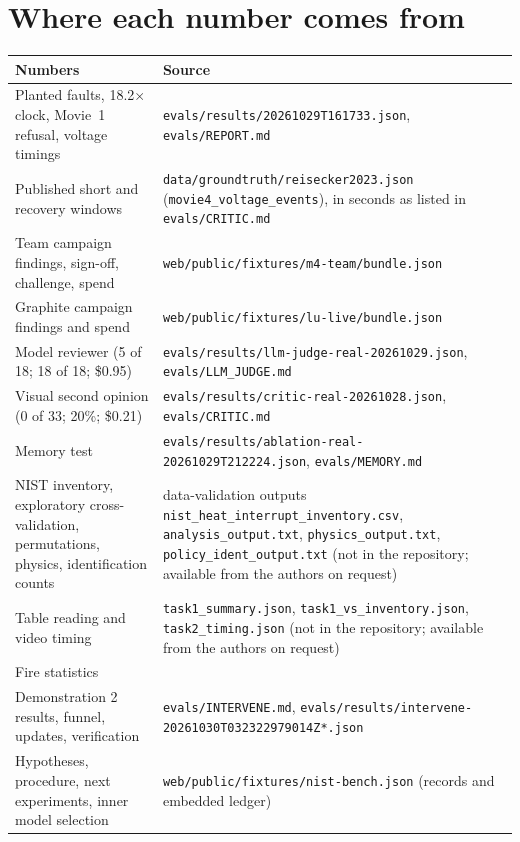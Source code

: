 \documentclass[11pt]{article}
\newcommand{\cmd}[1]{\texttt{#1}}
\begin{document}
\section{Where each number comes from}\label{app:sources}

\begin{table}[h]
\centering\small
\begin{tabular}{@{}>{\raggedright\arraybackslash}p{5.6cm}>{\raggedright\arraybackslash}p{10.2cm}@{}}
\toprule
Numbers & Source \\
\midrule
Planted faults, 18.2$\times$ clock, Movie~1 refusal, voltage timings & \cmd{evals/results/20261029T161733.json}, \cmd{evals/REPORT.md} \\
Published short and recovery windows & \cmd{data/groundtruth/reisecker2023.json} (\texttt{movie4\_voltage\_events}), in seconds as listed in \cmd{evals/CRITIC.md} \\
Team campaign findings, sign-off, challenge, spend & \cmd{web/public/fixtures/m4-team/bundle.json} \\
Graphite campaign findings and spend & \cmd{web/public/fixtures/lu-live/bundle.json} \\
Model reviewer (5 of 18; 18 of 18; \$0.95) & \cmd{evals/results/llm-judge-real-20261029.json}, \cmd{evals/LLM\_JUDGE.md} \\
Visual second opinion (0 of 33; 20\%; \$0.21) & \cmd{evals/results/critic-real-20261028.json}, \cmd{evals/CRITIC.md} \\
Memory test & \cmd{evals/results/ablation-real-20261029T212224.json}, \cmd{evals/MEMORY.md} \\
NIST inventory, exploratory cross-validation, permutations, physics, identification counts & data-validation outputs
\texttt{nist\_heat\_interrupt\_inventory.csv}, \texttt{analysis\_output.txt}, \texttt{physics\_output.txt},
\texttt{policy\_ident\_output.txt} (not in the repository; available from the authors on request) \\
Table reading and video timing & \texttt{task1\_summary.json}, \texttt{task1\_vs\_inventory.json},
\texttt{task2\_timing.json} (not in the repository; available from the authors on request) \\
Fire statistics & \citet{gilbert2026risk} \\
Demonstration 2 results, funnel, updates, verification & \cmd{evals/INTERVENE.md}, \cmd{evals/results/intervene-20261030T032322979014Z*.json} \\
Hypotheses, procedure, next experiments, inner model selection & \cmd{web/public/fixtures/nist-bench.json} (records and embedded ledger) \\

\end{tabular}
\end{table}
\end{document}
